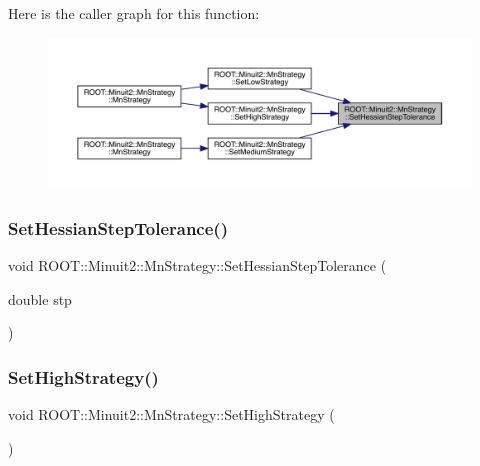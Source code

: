 Here is the caller graph for this function\+:
\nopagebreak
\begin{figure}[H]
\begin{center}
\leavevmode
\includegraphics[width=350pt]{da/de4/classROOT_1_1Minuit2_1_1MnStrategy_a8711f7c9983983c83fd5d192bc9304f7_icgraph}
\end{center}
\end{figure}
\mbox{\label{classROOT_1_1Minuit2_1_1MnStrategy_a8711f7c9983983c83fd5d192bc9304f7}} 
\subsubsection{\texorpdfstring{SetHessianStepTolerance()}{SetHessianStepTolerance()}\hspace{0.1cm}{\footnotesize\ttfamily [3/3]}}
{\footnotesize\ttfamily void R\+O\+O\+T\+::\+Minuit2\+::\+Mn\+Strategy\+::\+Set\+Hessian\+Step\+Tolerance (\begin{DoxyParamCaption}\item[{double}]{stp }\end{DoxyParamCaption})\hspace{0.3cm}{\ttfamily [inline]}}

\mbox{\label{classROOT_1_1Minuit2_1_1MnStrategy_a92e5deb2087eec6e0d7db5d5789f3a06}} 
\subsubsection{\texorpdfstring{SetHighStrategy()}{SetHighStrategy()}\hspace{0.1cm}{\footnotesize\ttfamily [1/3]}}
{\footnotesize\ttfamily void R\+O\+O\+T\+::\+Minuit2\+::\+Mn\+Strategy\+::\+Set\+High\+Strategy (\begin{DoxyParamCaption}{ }\end{DoxyParamCaption})}

